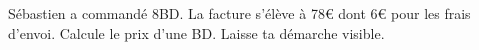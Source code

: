 %
%
	Sébastien a commandé 8BD. La facture s’élève à 78€ dont 6€ pour les frais d’envoi. Calcule le prix d’une BD. Laisse ta démarche visible.
